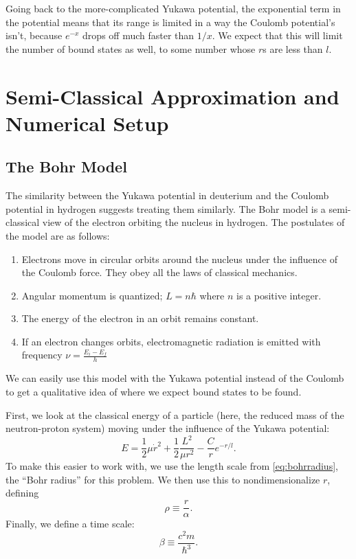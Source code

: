 \documentclass[12pt,twoside]{reedthesis}
\newcommand{\eqn}[1]{\begin{equation}#1\end{equation}}
\begin{document}
Going back to the more-complicated Yukawa potential, the exponential term in the potential means that its range is limited in a way the Coulomb potential's isn't, because $e^{-x}$ drops off much faster than $1/x$. We expect that this will limit the number of bound states as well, to some number whose $r$s are less than $l$.

\clearpage %

\chapter{Semi-Classical Approximation and Numerical Setup}
\section{The Bohr Model}
The similarity between the Yukawa potential in deuterium and the Coulomb potential in hydrogen suggests treating them similarly. The Bohr model is a semi-classical view of the electron orbiting the nucleus in hydrogen. The postulates of the model are as follows:
\begin{enumerate}
\item Electrons move in circular orbits around the nucleus under the influence of the Coulomb force. They obey all the laws of classical mechanics.
\item Angular momentum is quantized; $L = n\hbar$ where $n$ is a positive integer.
\item The energy of the electron in an orbit remains constant.
\item If an electron changes orbits, electromagnetic radiation is emitted with frequency $\nu = \frac{E_i-E_f}{h}$
\end{enumerate}
We can easily use this model with the Yukawa potential instead of the Coulomb to get a qualitative idea of where we expect bound states to be found.

First, we look at the classical energy of a particle (here, the reduced mass of the neutron-proton system) moving under the influence of the Yukawa potential:
\eqn{
E = \frac{1}{2}\mu \dot{r}^2+\frac{1}{2}\frac{L^2}{\mu r^2}-\frac{C}{r}e^{-r/l}\mbox{.}
\label{eq:classical-energy}
}
To make this easier to work with, we use the length scale from \eqref{eq:bohrradius}, the ``Bohr radius'' for this problem. We then use this to nondimensionalize $r$, defining
\begin{equation}
\rho \equiv \frac{r}{\alpha}\mbox{.}
\label{eq:rho}
\end{equation}
Finally, we define a time scale:
\begin{equation}
\beta \equiv \frac{c^2m}{\hbar^3}\mbox{.}
\label{eq:beta}
\end{equation}
\end{document}
